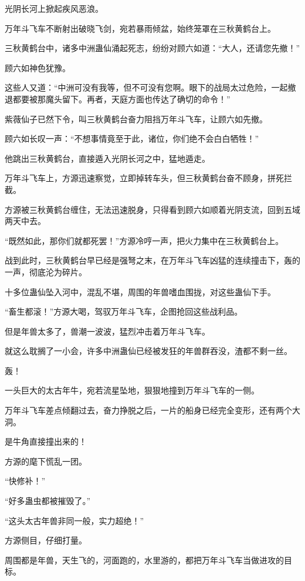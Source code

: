 
\begin{this_body}

光阴长河上掀起疾风恶浪。

万年斗飞车不断射出破晓飞剑，宛若暴雨倾盆，始终笼罩在三秋黄鹤台上。

三秋黄鹤台中，诸多中洲蛊仙涌起死志，纷纷对顾六如道：“大人，还请您先撤！”

顾六如神色犹豫。

这些人又道：“中洲可没有我等，但不可没有您啊。眼下的战局太过危险，一起撤退都要被那魔头留下。再者，天庭方面也传达了确切的命令！”

紫薇仙子已然下令，叫三秋黄鹤台奋力阻挡万年斗飞车，让顾六如先撤。

顾六如长叹一声：“不想事情竟至于此，诸位，你们绝不会白白牺牲！”

他跳出三秋黄鹤台，直接遁入光阴长河之中，猛地遁走。

万年斗飞车上，方源迅速察觉，立即掉转车头，但三秋黄鹤台奋不顾身，拼死拦截。

方源被三秋黄鹤台缠住，无法迅速脱身，只得看到顾六如顺着光阴支流，回到五域两天中去。

“既然如此，那你们就都死罢！”方源冷哼一声，把火力集中在三秋黄鹤台上。

战到此时，三秋黄鹤台早已经是强弩之末，在万年斗飞车凶猛的连续撞击下，轰的一声，彻底沦为碎片。

十多位蛊仙坠入河中，混乱不堪，周围的年兽嗜血围拢，对这些蛊仙下手。

“畜生都滚！”方源大喝，驾驭万年斗飞车，企图抢回这些战利品。

但是年兽太多了，兽潮一波波，猛烈冲击着万年斗飞车。

就这么耽搁了一小会，许多中洲蛊仙已经被发狂的年兽群吞没，渣都不剩一丝。

轰！

一头巨大的太古年牛，宛若流星坠地，狠狠地撞到万年斗飞车的一侧。

万年斗飞车差点倾翻过去，奋力挣脱之后，一片的船身已经完全变形，还有两个大洞。

是牛角直接撞出来的！

方源的麾下慌乱一团。

“快修补！”

“好多蛊虫都被摧毁了。”

“这头太古年兽非同一般，实力超绝！”

方源侧目，仔细打量。

周围都是年兽，天生飞的，河面跑的，水里游的，都把万年斗飞车当做进攻的目标。


\end{this_body}
